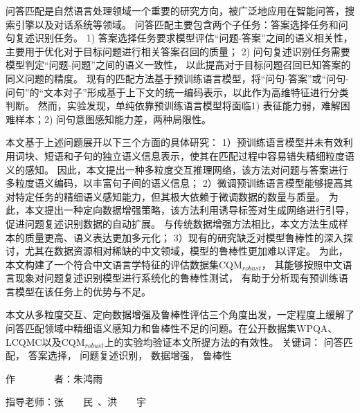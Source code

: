 
\begin{cabstract}

	问答匹配是自然语言处理领域一个重要的研究方向，被广泛地应用在智能问答，搜索引擎以及对话系统等领域。
	问答匹配主要包含两个子任务：答案选择任务和问句复述识别任务。
	1) 答案选择任务要求模型评估“问题-答案”之间的语义相关性，
	主要用于优化对于目标问题进行相关答案召回的质量；
	2) 问句复述识别任务需要模型判定“问题-问题”之间的语义一致性，
	以此提高对于目标问题召回已知答案的同义问题的精度。
	现有的匹配方法基于预训练语言模型，将“问句-答案”或“问句-问句”的“文本对子”形成基于上下文的统一编码表示，以此作为高维特征进行分类判断。
	然而，实验发现，单纯依靠预训练语言模型将面临1) 表征能力弱，难解困难样本；2) 问句意图感知能力差，两种局限性。


	本文基于上述问题展开以下三个方面的具体研究：
	1）预训练语言模型并未有效利用词块、短语和子句的独立语义信息表示，使其在匹配过程中容易错失精细粒度语义的感知。
	因此，本文提出一种多粒度交互推理网络，该方法对问题与答案进行多粒度语义编码，以丰富句子间的语义信息；
	2）微调预训练语言模型能够提高其对特定任务的精细语义感知能力，但其极大依赖于微调数据的数量与质量。
	为此，本文提出一种定向数据增强策略，该方法利用诱导标签对生成网络进行引导，促进问题复述识别数据的自动扩展。
	与传统数据增强方法相比，本文方法生成样本的质量更高、语义表达更加多元化；
	3）现有的研究缺乏对模型鲁棒性的深入探讨，尤其在数据资源相对稀缺的中文领域，模型的鲁棒性更加难以评定。
	为此，本文构建了一个符合中文语言学特征的评估数据集CQM$_{robust}$，
	其能够按照中文语言现象对问题复述识别模型进行系统化的鲁棒性测试，
	有助于分析现有预训练语言模型在该任务上的优势与不足。

	本文从多粒度交互、定向数据增强及鲁棒性评估三个角度出发，一定程度上缓解了问答匹配领域中精细语义感知力和鲁棒性不足的问题。在公开数据集WPQA、LCQMC以及CQM$_{robust}$上的实验均验证本文所提方法的有效性。
	\vskip 10bp
	\noindent
	{\heiti{} 关键词：}
	问答匹配，
	答案选择，
	问题复述识别，
	数据增强，
	鲁棒性
	
	\begin{flushright}
		{\heiti{} 作~~~~~~~~者：}朱鸿雨

		{\heiti{} 指导老师：}张~~~~民~、洪~~~~宇
	\end{flushright}

\end{cabstract}


